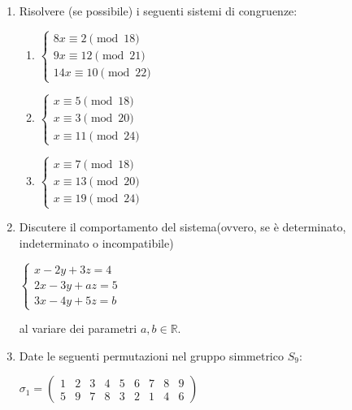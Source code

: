 \documentclass[fleqn]{article}
\begin{document}
\begin{enumerate}
   \item Risolvere (se possibile) i seguenti sistemi di congruenze:
   
   \begin{enumerate} 
      \item \begin{center} 
      $ \begin{cases}
         8x \equiv 2 \pmod{18} \\
         9x \equiv 12 \pmod{21} \\
         14x \equiv 10 \pmod{22} 
      \end{cases} $
      \end{center}
      \item \begin{center} 
      $ \begin{cases}
         x \equiv 5 \pmod{18} \\
         x \equiv 3 \pmod{20} \\
         x \equiv 11 \pmod{24} 
      \end{cases} $
      \end{center}
      \item \begin{center}
      $ \begin{cases}
         x \equiv 7 \pmod{18} \\
         x \equiv 13 \pmod{20} \\
         x \equiv 19 \pmod{24} 
      \end{cases} $
      \end{center}
   \end{enumerate}

   \item Discutere il comportamento del sistema(ovvero, se è determinato, indeterminato o incompatibile)
   \begin{center}
   $\begin{cases} 
      x-2y+3z = 4\\
      2x - 3y + az = 5\\
      3x - 4y + 5z  = b
   \end{cases}$ \\
   \end{center}
   al variare dei parametri $a,b \in \mathbb{R}$.

   \item Date le seguenti permutazioni nel gruppo simmetrico $S_9$:
   \begin{center}
      $ \sigma_{1} = \begin{pmatrix}
         1 & 2 & 3 & 4 & 5 & 6 & 7 & 8 & 9 \\
         5 & 9 & 7 & 8 & 3 & 2 & 1 & 4 & 6
      \end{pmatrix} $


\end{center}
\end{enumerate}
\end{document}
